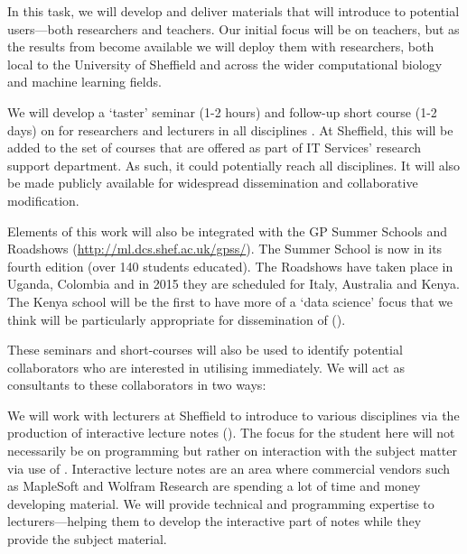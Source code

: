 \begin{workpackage}
\begin{tasklist}
\begin{task}[title=Introduce \TheProject to Researchers and Teachers, id=project-intro,lead=USH,PM=20,partners={USO}]

  In this task, we will develop and deliver materials that will
  introduce \TheProject to potential users---both researchers and
  teachers. Our initial focus will be on teachers, but as the results
  from  become available we will deploy them with
  researchers, both local to the University of Sheffield and across
  the wider computational biology and machine learning fields.

  We will develop a `taster' seminar (1-2 hours) and follow-up short course
  (1-2 days) on \TheProject for researchers and lecturers in all
  disciplines . At Sheffield, this will
  be added to the set of courses that are offered as part of IT
  Services' research support department. As such, it could potentially
  reach all disciplines. It will also be made publicly available for
  widespread dissemination and collaborative modification.

  Elements of this work will also be integrated with the GP Summer
  Schools and Roadshows (\url{http://ml.dcs.shef.ac.uk/gpss/}). The
  Summer School is now in its fourth edition (over 140 students
  educated). The Roadshows have taken place in Uganda, Colombia and in
  2015 they are scheduled for Italy, Australia and Kenya. The Kenya
  school will be the first to have more of a `data science' focus that
  we think will be particularly appropriate for dissemination of
  \TheProject ().

  These seminars and short-courses will also be used to identify
  potential collaborators who are interested in utilising \TheProject
  immediately. We will act as consultants to these collaborators in
  two ways:

  We will work with lecturers at Sheffield to introduce \TheProject to
  various disciplines via the production of interactive lecture notes
  (). The focus for the student here
  will not necessarily be on programming but rather on interaction
  with the subject matter via use of \TheProject. Interactive lecture
  notes are an area where commercial vendors such as MapleSoft and
  Wolfram Research are spending a lot of time and money developing
  material. We will provide technical and programming expertise to
  lecturers---helping them to develop the interactive part of notes
  while they provide the subject material.


\end{task}
\end{tasklist}
\end{workpackage}
